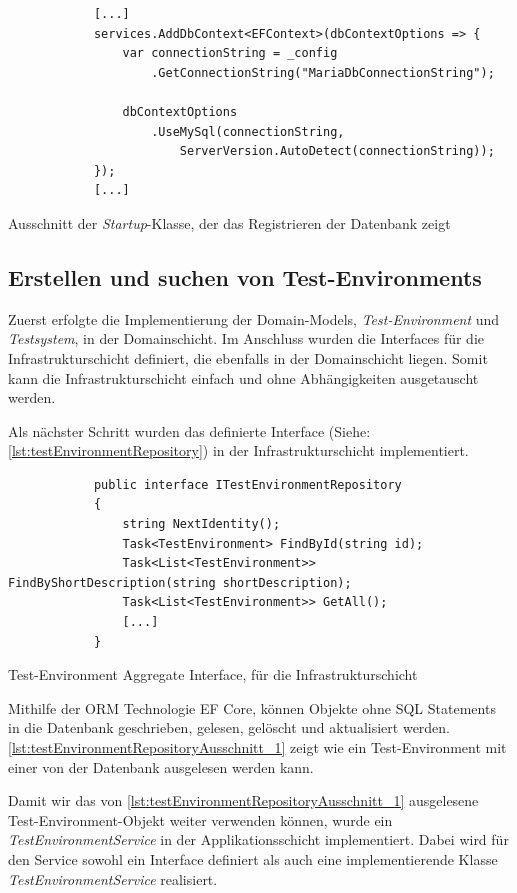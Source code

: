 \documentclass[a4paper, fontsize=11pt, parskip=half, twoside]{scrreprt}
\begin{document}
	\begin{listing}[ht]
		\begin{verbatim}
			[...]		
			services.AddDbContext<EFContext>(dbContextOptions => {
				var connectionString = _config
					.GetConnectionString("MariaDbConnectionString");
				
				dbContextOptions
					.UseMySql(connectionString,
						ServerVersion.AutoDetect(connectionString));
			});		
			[...]
		\end{verbatim}
		\caption{Ausschnitt der \emph{Startup}-Klasse, der das Registrieren der Datenbank zeigt}
		\label{lst:registerDatabase}
	\end{listing}

	\subsection{Erstellen und suchen von Test-Environments} \label{subsec:createAndSearchTestEnvironments}
	Zuerst erfolgte die Implementierung der Domain-Models, \emph{Test-Environment} und \emph{Testsystem}, in der Domainschicht.
	Im Anschluss wurden die Interfaces für die Infrastrukturschicht definiert, die ebenfalls in der Domainschicht liegen.
	Somit kann die Infrastrukturschicht einfach und ohne Abhängigkeiten ausgetauscht werden.
	
	Als nächster Schritt wurden das definierte Interface (Siehe: \autoref{lst:testEnvironmentRepository}) in der Infrastrukturschicht implementiert.

	\begin{listing}[ht]
		\begin{verbatim}
			public interface ITestEnvironmentRepository
			{
				string NextIdentity();
				Task<TestEnvironment> FindById(string id);
				Task<List<TestEnvironment>> FindByShortDescription(string shortDescription);
				Task<List<TestEnvironment>> GetAll();
				[...]
			}
		\end{verbatim}
		\caption{Test-Environment Aggregate Interface, für die Infrastrukturschicht}
		\label{lst:testEnvironmentRepository}
	\end{listing}

	Mithilfe der \ac{ORM} Technologie \ac{EF} Core, können Objekte ohne \ac{SQL} Statements in die Datenbank geschrieben, gelesen, gelöscht und aktualisiert werden.
	\autoref{lst:testEnvironmentRepositoryAusschnitt_1} zeigt wie ein Test-Environment mit einer  von der Datenbank ausgelesen werden kann.
	
	Damit wir das von \autoref{lst:testEnvironmentRepositoryAusschnitt_1} ausgelesene Test-Environment-Objekt weiter verwenden können, wurde ein \emph{TestEnvironmentService} in der Applikationsschicht implementiert. 
	Dabei wird für den Service sowohl ein Interface definiert als auch eine implementierende Klasse \emph{TestEnvironmentService} realisiert.
	
\end{document}
